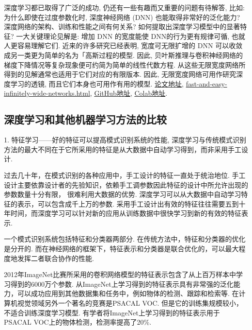 \begin{remark}
深度学习都已取得了广泛的成功, 仍还有一些有趣而又重要的问题有待解答,
比如: 为什么即使在过度参数化时, 深度神经网络 (DNN) 也能取得非常好的泛化能力?
深度网络的架构、训练和性能之间有何关系? 如何提取出深度学习模型中的显著特征?
一大关键理论见解是: 增加 DNN 的宽度能使 DNN的行为更有规律可循, 也就人更容易理解它们.
近来的许多研究已经表明, 宽度可无限扩增的 DNN 可以收敛成另一类更为简单的名为「高斯过程的模型.
因此, 贝叶斯推理与卷积神经网络的梯度下降情况等复杂现象便可约简为简单的线性代数方程.
从这些无限宽度网络所得到的见解通常也适用于它们对应的有限版本.
因此, 无限宽度网络可用作研究深度学习的透镜, 而且它们本身也可用作有用的模型.
\href{https://arxiv.org/abs/1912.02803}{论文地址},
\href{https://ai.googleblog.com/2020/03/fast-and-easy-infinitely-wide-networks.html}{fast-and-easy-infinitely-wide-networks.html},
\href{https://github.com/google/neural-tangents}{GitHub地址},
\href{https://colab.research.google.com/github/google/neural-tangents/blob/master/notebooks/neural_tangents_cookbook.ipynb}{Colab地址}.
\end{remark}
\subsection{深度学习和其他机器学习方法的比较}

1. 特征学习——好的特征可以提高模式识别系统的性能, 深度学习与传统模式识别方法的最大不同在于它所采用的特征是从大数据中自动学习得到，而非采用手工设计.

过去几十年，在模式识别的各种应用中，手工设计的特征一直处于统治地位. 手工设计主要依靠设计者的先验知识，依赖手工调参数因此特征的设计中所允许出现的参数数量十分有限， 很难利用大数据的优势.
深度学习可以从大数据中自动学习特征的表示，可以包含成千上万的参数. 采用手工设计出有效的特征往往需要五到十年时间，而深度学习可以针对新的应用从训练数据中很快学习到新的有效的特征表示.

一个模式识别系统包括特征和分类器两部分. 在传统方法中，特征和分类器的优化是分开的. 而在神经网络的框架下，特征表示和分类器是联合优化的，可以最大程度地发挥二者联合协作的性能.

\begin{example}
2012年ImageNet比赛所采用的卷积网络模型的特征表示包含了从上百万样本中学习得到的6000万个参数.
从ImageNet上学习得到的特征表示具有非常强的泛化能力，可以成功应用到其他数据集和任务中，例如物体的检测、跟踪和检索等.
在计算机视觉领域另外一个著名的竞赛是PSACAL VOC. 但是它的训练集规模较小，不适合训练深度学习模型. 有学者将ImageNet上学习得到的特征表示用于 PSACAL VOC上的物体检测，检测率提高了20\%.
\end{example}

